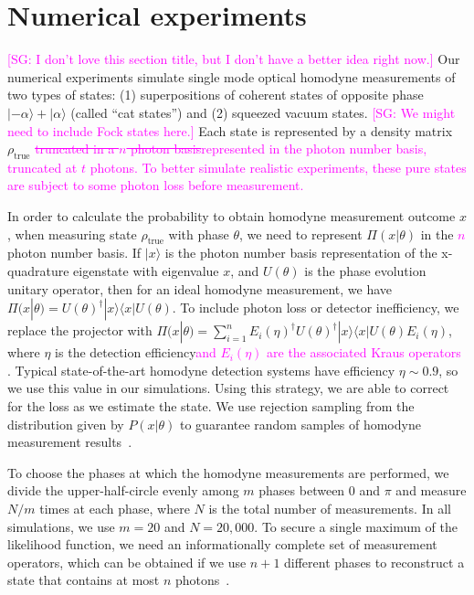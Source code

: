 \documentclass[
reprint,
superscriptaddress,
showpacs,
amsmath,
amssymb,
aps,
pra,
longbibliography
]{revtex4-1}
\providecommand{\aucmnt}[1]{#1}
\providecommand{\editcolor}[2]{\textcolor{#1}{#2}}
\providecommand{\aucmnt}[1]{}
\providecommand{\editcolor}[2]{#2}
\newcommand{\SG}[1]{\editcolor{magenta}{#1}}
\newcommand{\SGs}[1]{\aucmnt{\editcolor{magenta}{\sout{#1}}}}
\newcommand{\SGc}[1]{\aucmnt{\editcolor{magenta}{[SG: #1]}}}
\begin{document}
\section{Numerical experiments}
\label{numerical-experiments}
\SGc{I don't love this section title, but I don't have a better idea
  right now.}  Our numerical experiments simulate single mode optical
homodyne measurements of two types of states: (1) superpositions of
coherent states of opposite phase $|-\alpha\rangle + |\alpha\rangle$
(called ``cat states'') and (2) squeezed vacuum states. \SGc{We might
  need to include Fock states here.} Each state is represented by a
density matrix $\rho_{\mathrm{true}}$ \SGs{truncated in a $n$ photon
  basis}\SG{represented in the photon number basis, truncated at $t$
  photons.}  \SG{To better simulate realistic experiments, these pure
  states are subject to some photon loss before measurement.}

In order to calculate the probability to obtain homodyne measurement
outcome $x$, when measuring state $\rho_{\mathrm{true}}$ with phase
$\theta$, we need to represent $\Pi (x|\theta)$ in the \SGs{$n$}
photon number basis. If $|x\rangle$ is the photon number basis
representation of the x-quadrature eigenstate with eigenvalue $x$, and
$U(\theta)$ is the phase evolution unitary operator, then for an ideal
homodyne measurement, we have
$\Pi(x|\theta) = U(\theta)^{\dagger} |x\rangle \langle x|
U(\theta)$. To include photon loss or detector inefficiency, we
replace the projector with
$\Pi(x|\theta) = \sum_{i=1}^{n} E_i(\eta)^{\dagger}
U(\theta)^{\dagger} |x\rangle \langle x| U(\theta) E_i(\eta)$, where
$\eta$ is the detection efficiency\SG{and $E_i(\eta)$ are the
  associated Kraus operators \cite{Lvovsky2004}}.  Typical
state-of-the-art homodyne detection systems have efficiency
$\eta \sim 0.9$, so we use this value in our simulations. Using this
strategy, we are able to correct for the loss as we estimate the
state. We use rejection sampling from the distribution given by
$P(x|\theta)$ to guarantee random samples of homodyne measurement
results~\cite{Kennedy1980}.

To choose the phases at which the homodyne measurements are performed,
we divide the upper-half-circle evenly among $m$ phases between 0 and
$\pi$ and measure $N/m$ times at each phase, where $N$ is the total
number of measurements. In all simulations, we use $m=20$ and
$N = 20,000$. To secure a single maximum of the likelihood function,
we need an informationally complete set of measurement operators,
which can be obtained if we use $n+1$ different phases to reconstruct
a state that contains at most $n$ photons~\cite{Leonhardt1997}.
\end{document}
